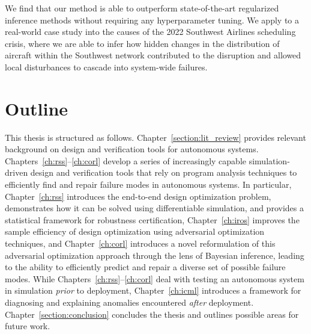 We find that our method is able to outperform state-of-the-art regularized inference methods without requiring any hyperparameter tuning. We apply \ouralg{} to a real-world case study into the causes of the 2022 Southwest Airlines scheduling crisis, where we are able to infer how hidden changes in the distribution of aircraft within the Southwest network contributed to the disruption and allowed local disturbances to cascade into system-wide failures.



\section{Outline}

This thesis is structured as follows. Chapter~\ref{section:lit_review} provides relevant background on design and verification tools for autonomous systems. Chapters~\ref{ch:rss}--\ref{ch:corl} develop a series of increasingly capable simulation-driven design and verification tools that rely on program analysis techniques to efficiently find and repair failure modes in autonomous systems. In particular, Chapter~\ref{ch:rss} introduces the end-to-end design optimization problem, demonstrates how it can be solved using differentiable simulation, and provides a statistical framework for robustness certification, Chapter~\ref{ch:iros} improves the sample efficiency of design optimization using adversarial optimization techniques, and Chapter~\ref{ch:corl} introduces a novel reformulation of this adversarial optimization approach through the lens of Bayesian inference, leading to the ability to efficiently predict and repair a diverse set of possible failure modes. While Chapters~\ref{ch:rss}--\ref{ch:corl} deal with testing an autonomous system in simulation \textit{prior} to deployment, Chapter~\ref{ch:icml} introduces a framework for diagnosing and explaining anomalies encountered \textit{after} deployment. Chapter~\ref{section:conclusion} concludes the thesis and outlines possible areas for future work.